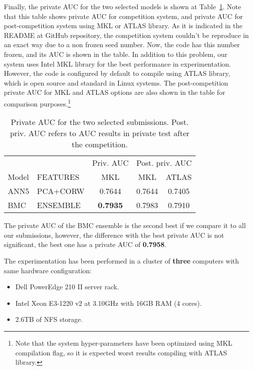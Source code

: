 \documentclass[a4paper,english,twoside]{article}
\begin{document}
Finally, the private AUC for the two selected models is shown at
Table~\ref{tab:private}. Note that this table shows private AUC for competition
system, and private AUC for post-competition system using MKL or ATLAS
library. As it is indicated in the README at GitHub repository, the competition
system couldn't be reproduce in an exact way due to a non frozen seed number.
Now, the code has this number frozen, and its AUC is shown in the table. In
addition to this problem, our system uses Intel MKL library for the best performance
in experimentation. However, the code is configured by default to compile using
ATLAS library, which is open source and standard in Linux systems. The
post-competition private AUC for MKL and ATLAS options are also shown in the
table for comparison purposes.\footnote{Note that the system hyper-parameters
  have been optimized using MKL compilation flag, so it is expected worst
  results compiling with ATLAS library.}

\begin{table}
  \centering
  \begin{tabular}{|l|l|c||c|c|}
    \hline
          &          & Priv. AUC & \multicolumn{2}{|c|}{Post. priv. AUC}\\
    Model & FEATURES & MKL & \multicolumn{1}{|c}{MKL} & \multicolumn{1}{c|}{ATLAS} \\
    \hline
    \hline
    ANN5 & PCA+CORW & 0.7644          & 0.7644 & 0.7405\\
    BMC & ENSEMBLE & \textbf{0.7935}  & 0.7983 & 0.7910\\
    \hline
  \end{tabular}
  \caption{Private AUC for the two selected submissions. Post. priv. AUC refers
    to AUC results in private test after the competition.\label{tab:private}}
\end{table}

The private AUC of the BMC ensemble is the second best if we compare it
to all our submissions, however, the difference with the best private
AUC is not significant, the best one has a private AUC of
\textbf{0.7958}.

The experimentation has been performed in a cluster of \textbf{three}
computers with same hardware configuration:

\begin{itemize}
\item
  Dell PowerEdge 210 II server rack.
\item
  Intel Xeon E3-1220 v2 at 3.10GHz with 16GB RAM (4 cores).
\item
  2.6TB of NFS storage.
\end{itemize}
\end{document}
